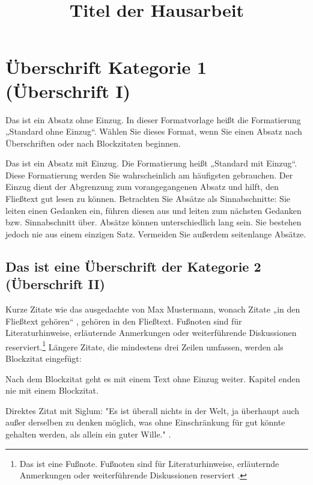 \documentclass{hausarbeit_philosophie}
\title{Titel der Hausarbeit}
\begin{document}
\maketitle
\tableofcontents
\newpage

\section{Überschrift Kategorie 1 (Überschrift I)}
Das ist ein Absatz ohne Einzug. In dieser Formatvorlage heißt die Formatierung „Standard ohne Einzug“. Wählen Sie dieses Format, wenn Sie einen Absatz nach Überschriften oder nach Blockzitaten beginnen.

Das ist ein Absatz mit Einzug. Die Formatierung heißt „Standard mit Einzug“. Diese Formatierung werden Sie wahrscheinlich am häufigsten gebrauchen. Der Einzug dient der Abgrenzung zum vorangegangenen Absatz und hilft, den Fließtext gut lesen zu können. Betrachten Sie Absätze als Sinnabschnitte: Sie leiten einen Gedanken ein, führen diesen aus und leiten zum nächsten Gedanken bzw. Sinnabschnitt über. Absätze können unterschiedlich lang sein. Sie bestehen jedoch nie aus einem einzigen Satz. Vermeiden Sie außerdem seitenlange Absätze.

\subsection{Das ist eine Überschrift der Kategorie 2 (Überschrift II)}
Kurze Zitate wie das ausgedachte von Max Mustermann, wonach Zitate „in den Fließtext gehören“ \parencite[14]{MusZit}, gehören in den Fließtext. Fußnoten sind für Literaturhinweise, erläuternde Anmerkungen oder weiterführende Diskussionen reserviert.\footnote{Das ist eine Fußnote. Fußnoten sind für Literaturhinweise, erläuternde Anmerkungen oder weiterführende Diskussionen reserviert .} Längere Zitate, die mindestens drei Zeilen umfassen, werden als Blockzitat eingefügt:


Nach dem Blockzitat geht es mit einem Text ohne Einzug weiter. Kapitel enden nie mit einem Blockzitat.

Direktes Zitat mit Siglum: "Es ist überall nichts in der Welt, ja überhaupt auch außer derselben zu denken möglich, was ohne Einschränkung für gut könnte gehalten werden, als allein ein guter Wille." \parencite[393]{GMS}.

\printbibliography
\end{document}
